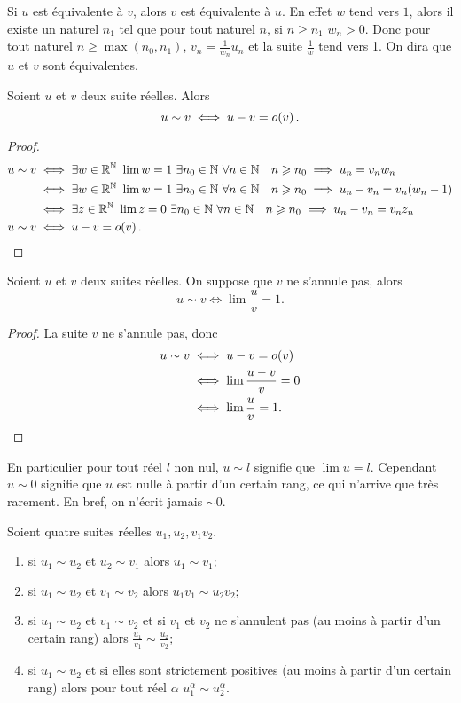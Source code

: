 Si $u$ est équivalente à $v$, alors $v$ est équivalente à $u$. En effet $w$ tend vers $1$, alors il existe un naturel $n_1$ tel que pour tout naturel $n$, si $n \geqslant n_1$ $w_n >0$. Donc pour tout naturel $n \geqslant \max(n_0,n_1)$, $v_n = \frac{1}{w_n} u_n$ et la suite $\frac{1}{w}$ tend vers 1. On dira que $u$ et $v$ sont équivalentes.

\begin{prop}
  Soient $u$ et $v$ deux suite réelles. Alors
  \begin{equation}
    u \sim v \iff u-v = o\mathopen{}\left(v\right).
  \end{equation}
\end{prop}
\begin{proof}
  \begin{align}
    u \sim v & \iff \exists w \in \R^\N \ \lim w =1 \ \exists n_0 \in \N \ \forall n \in \N \quad n \geqslant n_0 \implies u_n= v_n w_n \\
    & \iff \exists w \in \R^\N \ \lim w =1 \ \exists n_0 \in \N \ \forall n \in \N \quad n \geqslant n_0 \implies u_n-v_n= v_n (w_n -1) \\
    & \iff \exists z \in \R^\N \ \lim z =0 \ \exists n_0 \in \N \ \forall n \in \N \quad n \geqslant n_0 \implies u_n-v_n= v_n z_n \\
    u \sim v & \iff u-v = \petito{v}.
  \end{align}
\end{proof}
\begin{prop}
  Soient $u$ et $v$ deux suites réelles. On suppose que $v$ ne s'annule pas, alors
  \begin{equation}
    u \sim v \iff \lim \frac{u}{v}=1.
  \end{equation}
\end{prop}
\begin{proof}
  La suite $v$ ne s'annule pas, donc
  \begin{align}
    u \sim v & \iff u-v = o\mathopen{}\left(v\right) \\
    & \iff \lim \frac{u-v}{v} =0 \\
    & \iff \lim \frac{u}{v} =1.
  \end{align}
\end{proof}
En particulier pour tout réel $l$ non nul, $u \sim l$ signifie que $\lim u =l$. Cependant $u \sim 0$ signifie que $u$ est nulle à partir d'un certain rang, ce qui n'arrive que très rarement. En bref, on n'écrit jamais $\sim 0$.
\begin{prop}
  Soient quatre suites réelles $u_1, u_2, v_1 v_2$.
  \begin{enumerate}
  \item si $u_1 \sim u_2$ et $u_2 \sim v_1$ alors $u_1 \sim v_1$;  
  \item si $u_1 \sim u_2$ et $v_1 \sim v_2$ alors $u_1 v_1 \sim u_2 v_2$;
  \item si $u_1 \sim u_2$ et $v_1 \sim v_2$ et si $v_1$ et $v_2$ ne s'annulent pas (au moins à partir d'un certain rang) alors $\frac{u_1}{v_1} \sim \frac{u_2}{v_2}$;
  \item si $u_1 \sim u_2$ et si elles sont strictement positives (au moins à partir d'un certain rang) alors pour tout réel $\alpha$ $u_1^\alpha \sim u_2^\alpha$.
  \end{enumerate}
\end{prop}
